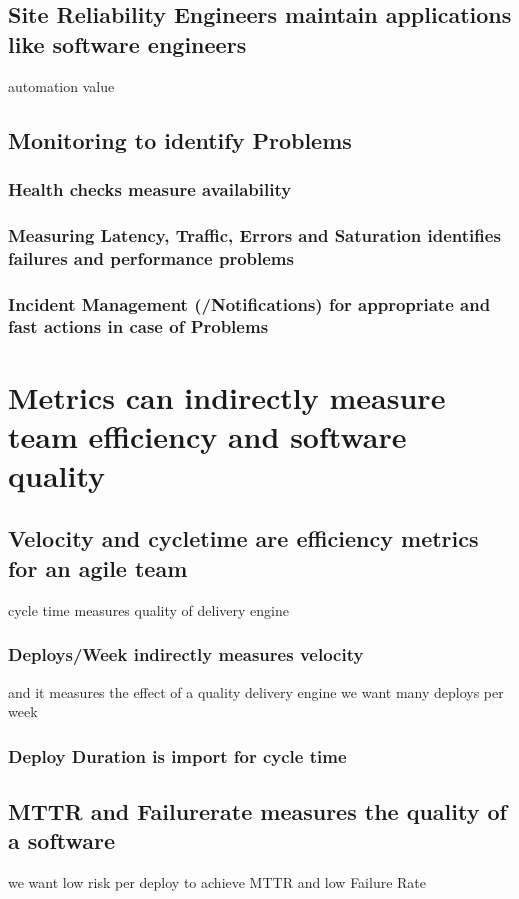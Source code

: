 \section{Site Reliability Engineers maintain applications like software engineers}

automation value

\section{Monitoring to identify Problems}
\subsection{Health checks measure availability}
\subsection{Measuring Latency, Traffic, Errors and Saturation identifies failures and performance problems}
\subsection{Incident Management (/Notifications) for appropriate and fast actions in case of Problems}

\chapter{Metrics can indirectly measure team efficiency and software quality}
\section{Velocity and cycletime are efficiency metrics for an agile team}
cycle time measures quality of delivery engine
\subsection{Deploys/Week indirectly measures velocity}
and it measures the effect of a quality delivery engine
we want many deploys per week
\subsection{Deploy Duration is import for cycle time}
\section{MTTR and Failurerate measures the quality of a software}
we want low risk per deploy to achieve MTTR and low Failure Rate
